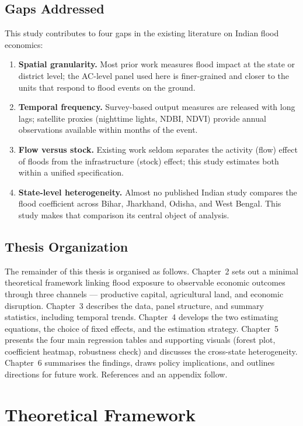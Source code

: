\documentclass[12pt,a4paper,oneside]{report}
\begin{document}
\section{Gaps Addressed}
This study contributes to four gaps in the existing literature on Indian flood economics:
\begin{enumerate}[label=(\roman*),leftmargin=2.2em,itemsep=4pt]
\item \textbf{Spatial granularity.} Most prior work measures flood impact at the state or district level; the AC-level panel used here is finer-grained and closer to the units that respond to flood events on the ground.
\item \textbf{Temporal frequency.} Survey-based output measures are released with long lags; satellite proxies (nighttime lights, NDBI, NDVI) provide annual observations available within months of the event.
\item \textbf{Flow versus stock.} Existing work seldom separates the activity (flow) effect of floods from the infrastructure (stock) effect; this study estimates both within a unified specification.
\item \textbf{State-level heterogeneity.} Almost no published Indian study compares the flood coefficient across Bihar, Jharkhand, Odisha, and West Bengal. This study makes that comparison its central object of analysis.
\end{enumerate}

\section{Thesis Organization}
The remainder of this thesis is organised as follows. Chapter~2 sets out a minimal theoretical framework linking flood exposure to observable economic outcomes through three channels --- productive capital, agricultural land, and economic disruption. Chapter~3 describes the data, panel structure, and summary statistics, including temporal trends. Chapter~4 develops the two estimating equations, the choice of fixed effects, and the estimation strategy. Chapter~5 presents the four main regression tables and supporting visuals (forest plot, coefficient heatmap, robustness check) and discusses the cross-state heterogeneity. Chapter~6 summarises the findings, draws policy implications, and outlines directions for future work. References and an appendix follow.

\chapter{Theoretical Framework}
\end{document}
